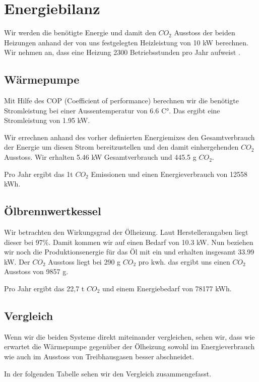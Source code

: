 \chapter{Energiebilanz}
\label{chap:bilanz}

Wir werden die benötigte Energie und damit den $CO_2$ Ausstoss der beiden
Heizungen anhand der von uns festgelegten Heizleistung von 10 kW berechnen.
Wir nehmen an, dass eine Heizung 2300 Betriebsstunden pro Jahr aufweist
\cite{heizung:heizung}.

\section{Wärmepumpe}

Mit Hilfe des COP (Coefficient of performance) berechnen wir die benötigte Stromleistung bei einer
Aussentemperatur von 6.6 C°.
Das ergibt eine Stromleistung von 1.95 kW.

Wir errechnen anhand des vorher definierten Energiemixes den Gesamtverbrauch
der Energie um diesen Strom bereitzustellen und den damit einhergehenden $CO_2$
Ausstoss.
Wir erhalten 5.46 kW Gesamtverbrauch und 445.5 g $CO_2$.

Pro Jahr ergibt das 1t $CO_2$ Emissionen und einen Energieverbrauch von 12558 kWh.

\section{Ölbrennwertkessel}

Wir betrachten den Wirkungsgrad der Ölheizung.
Laut Herstellerangaben liegt dieser bei 97\%.
Damit kommen wir auf einen Bedarf von 10.3 kW.
Nun beziehen wir noch die Produktionsenergie für das Öl mit ein und erhalten
insgesamt 33.99 kW.
Der $CO_2$ Ausstoss liegt bei 290 g $CO_2$ pro kwh.\cite{heizung:co2vergleich}
das ergibt uns einen $CO_2$ Ausstoss von 9857 g.

Pro Jahr ergibt das 22,7 t $CO_2$ und einem Energiebedarf von 78177 kWh.


\section{Vergleich}

Wenn wir die beiden Systeme direkt miteinander vergleichen, sehen wir, dass
wie erwartet die Wärmepumpe gegenüber der Ölheizung
sowohl im Energieverbrauch wie auch im Ausstoss von Treibhausgasen besser abschneidet.

In der folgenden Tabelle sehen wir den Vergleich zusammengefasst.

